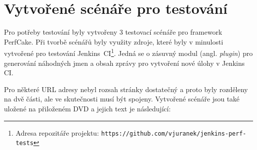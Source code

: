 \chapter{Vytvořené scénáře pro testování} \label{prilohaScenare}
    Pro potřeby testování byly vytvořeny 3 testovací scénáře pro framework PerfCake. 
    Při tvorbě scénářů byly využity zdroje, které byly v minulosti vytvořené pro testování 
    Jenkins~CI\footnote{Adresa repozitáře projektu: 
    \texttt{https://github.com/vjuranek/jenkins-perf-tests}}.
    Jedná se o zásuvný modul (angl. \emph{plugin}) pro 
    generování náhodných jmen a obsah zprávy pro vytvoření nové úlohy v Jenkins CI. 

    \medskip

    Pro některé URL adresy nebyl rozsah stránky dostatečný a proto byly
    rozděleny na dvě části, ale ve skutečnosti musí být spojeny.
    Vytvořené scénáře jsou také uložené na přiloženém DVD a jejich text je následující:
